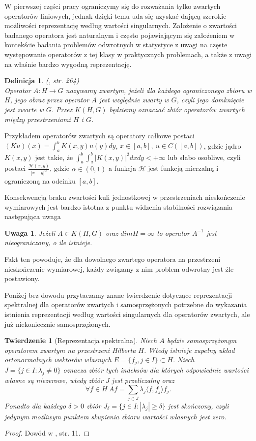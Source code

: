 \documentclass{mwart}
\newtheorem{tw}{Twierdzenie}
\newtheorem{df}{Definicja}
\newtheorem{uw}{Uwaga}
\begin{document}
W pierwszej części pracy ograniczymy się do rozważania tylko zwartych operatorów liniowych, jednak dzięki temu uda się uzyskać dającą szerokie możliwości reprezentację według wartości singularnych. Założenie o zwartości badanego operatora jest naturalnym i często pojawiającym się założeniem w kontekście badania problemów odwrotnych w statystyce z uwagi na częste występowanie operatorów z tej klasy w praktycznych problemach, a także z uwagi na właśnie bardzo wygodną reprezentację. 

\begin{df}(\cite{hindus}, str. 264)\\
Operator $A\colon H \to G$ nazywamy zwartym, jeżeli dla każdego ograniczonego zbioru w $H$, jego obraz przez operator $A$ jest względnie zwarty w $G$, czyli jego domknięcie jest zwarte w $G$. Przez $K(H,G)$ będziemy oznaczać zbiór operatorów zwartych między przestrzeniami $H$ i $G$.
\end{df}

Przykładem operatorów zwartych są operatory całkowe postaci $\left(Ku\right)(x)=\int_a^bK(x,y)u(y)dy$, $x\in [a,b],\ u\in C([a,b])$, gdzie jądro $K(x,y)$ jest takie, że $\int_a^b\int_a^b|K(x,y)|^2dxdy<+\infty$ lub słabo osobliwe, czyli postaci $\frac{\mathcal{H}(x,y)}{|x-y|^{\alpha}}$, gdzie $\alpha\in (0,1)$ a funkcja $\mathcal{H}$ jest funkcją mierzalną i ograniczoną na odcinku $[a,b]$.

Konsekwencją braku zwartości kuli jednostkowej w przestrzeniach nieskończenie wymiarowych jest bardzo istotna z punktu widzenia stabilności rozwiązania następująca uwaga
\begin{uw}
Jeżeli $A\in K(H,G)$ oraz $dimH=\infty$ to operator $A^{-1}$ jest nieograniczony, o ile istnieje.
\end{uw}
Fakt ten powoduje, że dla dowolnego zwartego operatora na przestrzeni nieskończenie wymiarowej, każdy związany z nim problem odwrotny jest źle postawiony.

Poniżej bez dowodu przytaczamy znane twierdzenie dotyczące reprezentacji spektralnej dla operatorów zwartych i samosprzężonych potrzebne do wykazania istnienia reprezentacji według wartości singularnych dla operatorów zwartych, ale już niekoniecznie samosprzężonych.

\begin{tw}[Reprezentacja spektralna]
Niech $A$ będzie samosprzężonym operatorem zwartym na przestrzeni Hilberta $H$. Wtedy istnieje zupełny układ ortonormalnych wektorów własnych $E=\{f_j,j\in I\}\subset H$. Niech $J=\{j\in I\colon\lambda_j\neq 0\}$ oznacza zbiór tych indeksów dla których odpowiednie wartości własne są niezerowe, wtedy zbiór $J$ jest przeliczalny oraz 
\begin{displaymath}
\forall f\in H\ Af=\sum_{j\in J}\lambda_j\langle f,f_j\rangle f_j.
\end{displaymath}
Ponadto dla każdego $\delta>0$ zbiór $J_{\delta}=\{j\in I\colon |\lambda_j|\geq \delta\}$ jest skończony, czyli jedynym możliwym punktem skupienia zbioru wartości własnych jest zero.
\end{tw}
\begin{proof}
Dowód w \cite{iphde}, str. 11.
\end{proof}
\end{document}
